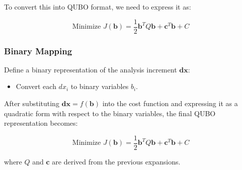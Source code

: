 \documentclass{article}
\begin{document}
To convert this into QUBO format, we need to express it as:

\[
\text{Minimize } J(\mathbf{b}) = \frac{1}{2} \mathbf{b}^T Q \mathbf{b} + \mathbf{c}^T \mathbf{b} + C
\]

\subsubsection{Binary Mapping}

Define a binary representation of the analysis increment \( \mathbf{dx} \):

\begin{itemize}
    \item Convert each \( dx_i \) to binary variables \( b_i \).
\end{itemize}

After substituting \( \mathbf{dx} = f(\mathbf{b}) \) into the cost function and expressing it as a quadratic form with respect to the binary variables, the final QUBO representation becomes:

\[
\text{Minimize } J(\mathbf{b}) = \frac{1}{2} \mathbf{b}^T Q \mathbf{b} + \mathbf{c}^T \mathbf{b} + C
\]

where \( Q \) and \( \mathbf{c} \) are derived from the previous expansions.
\end{document}
